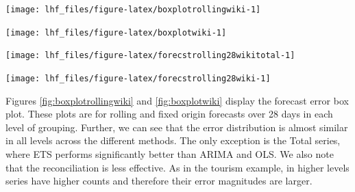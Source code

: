 \documentclass[11pt,a4paper,]{article}
\let\origfigure\figure
\let\endorigfigure\endfigure
\renewenvironment{figure}[1][2] {
    \expandafter\origfigure\expandafter[!htbp]
} {
    \endorigfigure
}
\begin{document}
\begin{figure}

{\centering \texttt{[image: lhf\_files/figure-latex/boxplotrollingwiki-1]} 

}

\caption{Box plots of forecast errors for reconciled and unreconciled ETS, ARIMA and OLS methods at each hierarchical level for rolling origin forecasts of Wikipedia pageviews.}\label{fig:boxplotrollingwiki}
\end{figure}

\begin{figure}

{\centering \texttt{[image: lhf\_files/figure-latex/boxplotwiki-1]} 

}

\caption{Box plots of forecast errors for reconciled and unreconciled ETS, ARIMA and OLS methods at each hierarchical level for fixed origin forecasts of Wikipedia pageviews.}\label{fig:boxplotwiki}
\end{figure}

\begin{figure}

{\centering \texttt{[image: lhf\_files/figure-latex/forecstrolling28wikitotal-1]} 

}

\caption{The actual test set for the 'Total' series compared to the forecasts from reconciled and unreconciled ETS, ARIMA and OLS methods for rolling and fixed origin forecasts of Wikipedia pageviews.}\label{fig:forecstrolling28wikitotal}
\end{figure}

\begin{figure}

{\centering \texttt{[image: lhf\_files/figure-latex/forecstrolling28wiki-1]} 

}

\caption{The actual test set for the 'desktopusenPho04' bottom level series compared to the forecasts from reconciled and unreconciled ETS, ARIMA and OLS methods for rolling and fixed origin forecasts of Wikipedia pageviews.}\label{fig:forecstrolling28wiki}
\end{figure}

Figures \ref{fig:boxplotrollingwiki} and \ref{fig:boxplotwiki} display the forecast error box plot. These plots are for rolling and fixed origin forecasts over 28 days in each level of grouping. Further, we can see that the error distribution is almost similar in all levels across the different methods. The only exception is the Total series, where ETS performs significantly better than ARIMA and OLS. We also note that the reconciliation is less effective. As in the tourism example, in higher levels series have higher counts and therefore their error magnitudes are larger.
\end{document}
